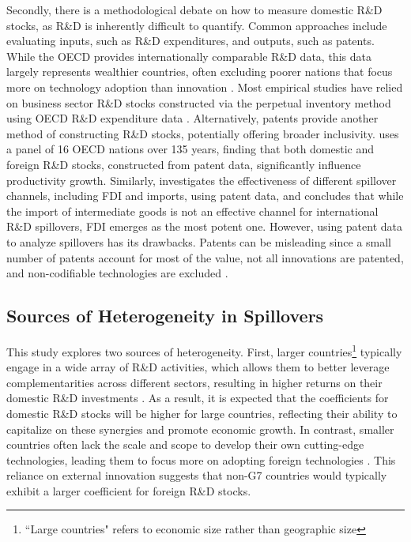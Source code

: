 \documentclass[12pt]{article}
\begin{document}
Secondly, there is a methodological debate on how to measure domestic R\&D stocks, as R\&D is inherently difficult to quantify. Common approaches include evaluating inputs, such as R\&D expenditures, and outputs, such as patents. While the OECD provides internationally comparable R\&D data, this data largely represents wealthier countries, often excluding poorer nations that focus more on technology adoption than innovation \citep{Keller2010}. Most empirical studies have relied on business sector R\&D stocks constructed via the perpetual inventory method using OECD R\&D expenditure data \citep{Coe1995, Coe1997, Coe2009, Engelbrecht1997}. Alternatively, patents provide another method of constructing R\&D stocks, potentially offering broader inclusivity. \citet{Madsen2007} uses a panel of 16 OECD nations over 135 years, finding that both domestic and foreign R\&D stocks, constructed from patent data, significantly influence productivity growth. Similarly, \citet{Lee2006} investigates the effectiveness of different spillover channels, including FDI and imports, using patent data, and concludes that while the import of intermediate goods is not an effective channel for international R\&D spillovers, FDI emerges as the most potent one. However, using patent data to analyze spillovers has its drawbacks. Patents can be misleading since a small number of patents account for most of the value, not all innovations are patented, and non-codifiable technologies are excluded \citep{Jaffe2002}. 

\subsection{Sources of Heterogeneity in Spillovers}

This study explores two sources of heterogeneity. First, larger countries\footnote{``Large countries" refers to economic size rather than geographic size} typically engage in a wide array of R\&D activities, which allows them to better leverage complementarities across different sectors, resulting in higher returns on their domestic R\&D investments \citep{Coe1995}. As a result, it is expected that the coefficients for domestic R\&D stocks will be higher for large countries, reflecting their ability to capitalize on these synergies and promote economic growth. In contrast, smaller countries often lack the scale and scope to develop their own cutting-edge technologies, leading them to focus more on adopting foreign technologies \citep{Santacreu2015}. This reliance on external innovation suggests that non-G7 countries would typically exhibit a larger coefficient for foreign R\&D stocks.  
\end{document}
